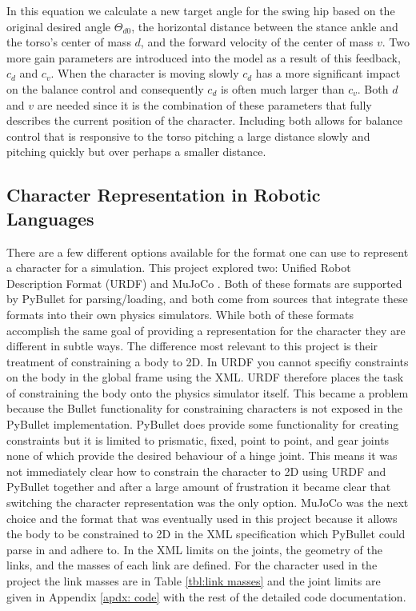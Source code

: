 \documentclass[12pt, a4paper]{article}
\begin{document}
In this equation we calculate a new target angle for the swing hip based on the original desired angle $\Theta_{d0}$, the horizontal distance between the stance ankle and the torso's center of mass $d$, and the forward velocity of the center of mass $v$. Two more gain parameters are introduced into the model as a result of this feedback, $c_d$ and $c_v$. When the character is moving slowly $c_d$ has a more significant impact on the balance control and consequently $c_d$ is often much larger than $c_v$. Both $d$ and $v$ are needed since it is the combination of these parameters that fully describes the current position of the character. Including both allows for balance control that is responsive to the torso pitching a large distance slowly and pitching quickly but over perhaps a smaller distance. 

\subsection{Character Representation in Robotic Languages}
There are a few different options available for the format one can use to represent a character for a simulation. This project explored two: Unified Robot Description Format (URDF) \cite{urdf} and MuJoCo \cite{mujoco}. Both of these formats are supported by PyBullet for parsing/loading, and both come from sources that integrate these formats into their own physics simulators. While both of these formats accomplish the same goal of providing a representation for the character they are different in subtle ways. The difference most relevant to this project is their treatment of constraining a body to 2D. In URDF you cannot specifiy constraints on the body in the global frame using the XML. URDF therefore places the task of constraining the body onto the physics simulator itself. This became a problem because the Bullet functionality for constraining characters is not exposed in the PyBullet implementation. PyBullet does provide some functionality for creating constraints but it is limited to prismatic, fixed, point to point, and gear joints none of which provide the desired behaviour of a hinge joint. This means it was not immediately clear how to constrain the character to 2D using URDF and PyBullet together and after a large amount of frustration it became clear that switching the character representation was the only option. MuJoCo was the next choice and the format that was eventually used in this project because it allows the body to be constrained to 2D in the XML specification which PyBullet could parse in and adhere to. In the XML limits on the joints, the geometry of the links, and the masses of each link are defined. For the character used in the project the link masses are in Table \ref{tbl:link masses} and the joint limits are given in Appendix \ref{apdx: code} with the rest of the detailed code documentation.
\end{document}
